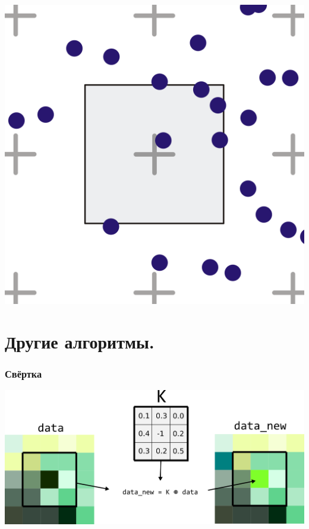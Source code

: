 \documentclass[10pt,pdf,hyperref={unicode}]{beamer}
\begin{document}
\begin{frame}[fragile]
\begin{itemize}
\begin{multicols}{2}
\begin{center}
\includegraphics[scale=0.05]{./images/supersampling2.png}
\end{center}
\end{multicols}

\end{itemize}
\end{frame}


\section*{Другие алгоритмы.}
\begin{frame}[fragile]
\frametitle{Свёртка} 
\begin{center}
\includegraphics[scale=0.75]{./images/image_conv.png}
\end{center}
\end{frame}
\end{document}
